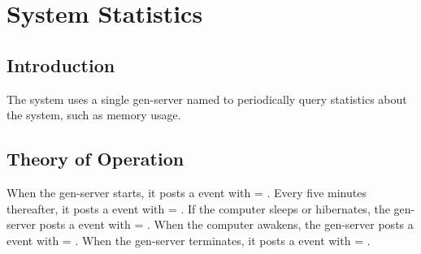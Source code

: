%
%
%

\chapter {System Statistics}\label{chap:stats}

\section {Introduction}

The system uses a single gen-server named  to
periodically query statistics about the system, such as memory usage.

\section {Theory of Operation}

When the  gen-server starts, it posts a
 event with  = .
Every five minutes thereafter, it posts a  event
with  = . If the computer sleeps or
hibernates, the gen-server posts a  event with
 = . When the computer awakens, the
gen-server posts a  event with  =
. When the gen-server terminates, it posts a
 event with  = .

